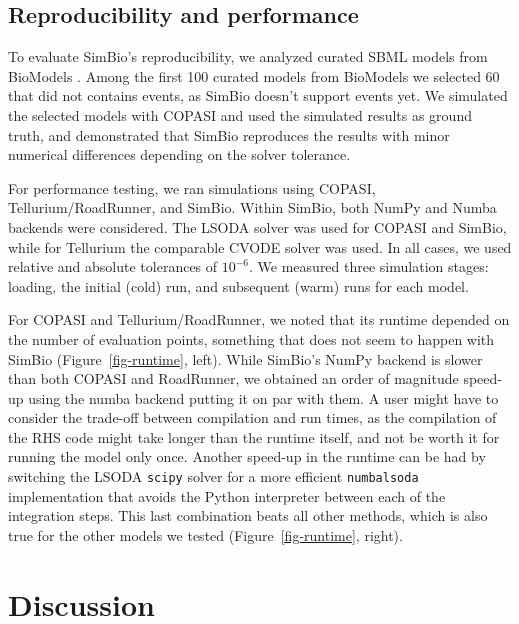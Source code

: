 \documentclass[
  letterpaper,
  DIV=11,
  numbers=noendperiod]{scrartcl}
\begin{document}


\hypertarget{reproducibility-and-performance}{%
\subsection{Reproducibility and
performance}\label{reproducibility-and-performance}}



To evaluate SimBio's reproducibility, we analyzed curated \ac{SBML} models
from BioModels \cite{malik-sheriffBioModels15Years2020}. Among the first 100 curated
models from BioModels we selected 60 that did not contains events, as
SimBio doesn't support events yet. We simulated the selected models with
COPASI and used the simulated results as ground truth, and demonstrated
that SimBio reproduces the results with minor numerical differences
depending on the solver tolerance.

For performance testing, we ran simulations using COPASI,
Tellurium/RoadRunner, and SimBio. Within SimBio, both NumPy and Numba
backends were considered. The LSODA solver was used for COPASI and
SimBio, while for Tellurium the comparable CVODE solver was used. In all
cases, we used relative and absolute tolerances of \(10^{-6}\). We
measured three simulation stages: loading, the initial (cold) run, and
subsequent (warm) runs for each model.

For COPASI and Tellurium/RoadRunner, we noted that its runtime depended
on the number of evaluation points, something that does not seem to
happen with SimBio (Figure~\ref{fig-runtime}, left). While SimBio's
NumPy backend is slower than both COPASI and RoadRunner, we obtained an
order of magnitude speed-up using the numba backend putting it on par
with them. A user might have to consider the trade-off between
compilation and run times, as the compilation of the
\ac{RHS} code might take longer than the runtime itself, and not be worth
it for running the model only once. Another speed-up in the runtime can
be had by switching the LSODA \texttt{scipy} solver for a more efficient
\texttt{numbalsoda} implementation that avoids the Python interpreter
between each of the integration steps. This last combination beats all
other methods, which is also true for the other models we tested
(Figure~\ref{fig-runtime}, right).

\hypertarget{discussion}{%
\section{Discussion}\label{discussion}}
\end{document}
